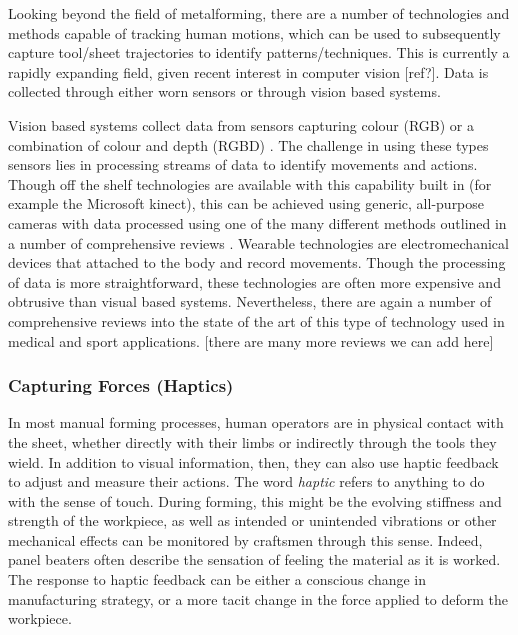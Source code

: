 Looking beyond the field of metalforming, there are a number of technologies and methods capable of tracking human motions, which can be used to subsequently capture tool/sheet trajectories to identify patterns/techniques. This is currently a rapidly expanding field, given recent interest in computer vision [ref?]. Data is collected through either worn sensors or through vision based systems.

Vision based systems collect data from sensors capturing colour (RGB) or a combination of colour and depth (RGBD) \citep{Zhang2019AMethods}. The challenge in using these types sensors lies in processing streams of data to identify movements and actions. Though off the shelf technologies are available with this capability built in (for example the Microsoft kinect), this can be achieved using generic, all-purpose cameras with data processed using one of the many different methods outlined in a number of comprehensive reviews \citep{Zhang2019AMethods,Beddiar2020Vision-basedSurvey}. Wearable technologies are electromechanical devices that attached to the body and record movements. Though the processing of data is more straightforward, these technologies are often more expensive and obtrusive than visual based systems. Nevertheless, there are again a number of comprehensive reviews into the state of the art of this type of technology used in medical \citep{Homayounfar2020WearableChallenges} and sport \citep{Taborri2020SportOverview} applications. [there are many more reviews we can add here]

\subsubsection{Capturing Forces (Haptics)}
In most manual forming processes, human operators are in physical contact with the sheet, whether directly with their limbs or indirectly through the tools they wield. In addition to visual information, then, they can also use haptic feedback to adjust and measure their actions. The word \textit{haptic} refers to anything to do with the sense of touch. During forming, this might be the evolving stiffness and strength of the workpiece, as well as intended or unintended vibrations or other mechanical effects can be monitored by craftsmen through this sense. Indeed, panel beaters often describe the sensation of feeling the material as it is worked. The response to haptic feedback can be either a conscious change in manufacturing strategy, or a more tacit change in the force applied to deform the workpiece. 


